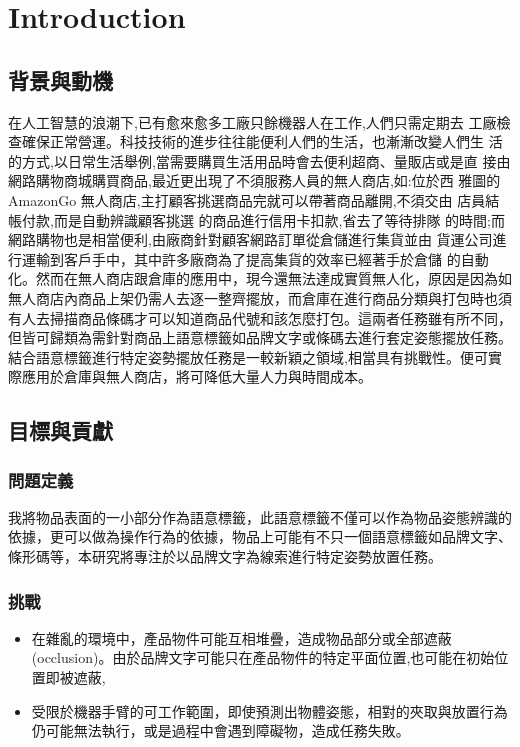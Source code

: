 \chapter{Introduction}
\label{chapter:intro}

\section{背景與動機}

在人工智慧的浪潮下,已有愈來愈多工廠只餘機器人在工作,人們只需定期去
工廠檢查確保正常營運。科技技術的進步往往能便利人們的生活，也漸漸改變人們生
活的方式,以日常生活舉例,當需要購買生活用品時會去便利超商、量販店或是直
接由網路購物商城購買商品,最近更出現了不須服務人員的無人商店,如:位於西
雅圖的 AmazonGo 無人商店,主打顧客挑選商品完就可以帶著商品離開,不須交由
店員結帳付款,而是自動辨識顧客挑選 的商品進行信用卡扣款,省去了等待排隊
的時間;而網路購物也是相當便利,由廠商針對顧客網路訂單從倉儲進行集貨並由
貨運公司進行運輸到客戶手中，其中許多廠商為了提高集貨的效率已經著手於倉儲
的自動化。然而在無人商店跟倉庫的應用中，現今還無法達成實質無人化，原因是因為如無人商店內商品上架仍需人去逐一整齊擺放，而倉庫在進行商品分類與打包時也須有人去掃描商品條碼才可以知道商品代號和該怎麼打包。這兩者任務雖有所不同，但皆可歸類為需針對商品上語意標籤如品牌文字或條碼去進行套定姿態擺放任務。結合語意標籤進行特定姿勢擺放任務是一較新穎之領域,相當具有挑戰性。便可實際應用於倉庫與無人商店，將可降低大量人力與時間成本。


\section{目標與貢獻}

\subsection{問題定義}
我將物品表面的一小部分作為語意標籤，此語意標籤不僅可以作為物品姿態辨識的依據，更可以做為操作行為的依據，物品上可能有不只一個語意標籤如品牌文字、條形碼等，本研究將專注於以品牌文字為線索進行特定姿勢放置任務。

\subsection{挑戰}
\begin{itemize}
\item 在雜亂的環境中，產品物件可能互相堆疊，造成物品部分或全部遮蔽(occlusion)。由於品牌文字可能只在產品物件的特定平面位置,也可能在初始位置即被遮蔽,
\item 受限於機器手臂的可工作範圍，即使預測出物體姿態，相對的夾取與放置行為仍可能無法執行，或是過程中會遇到障礙物，造成任務失敗。
\end{itemize}

